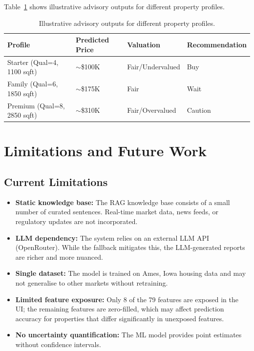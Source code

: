 \documentclass[11pt,a4paper]{article}
\begin{document}
Table~\ref{tab:advisory-examples} shows illustrative advisory outputs for different property profiles.

\begin{table}[H]
    \centering
    \caption{Illustrative advisory outputs for different property profiles.}
    \label{tab:advisory-examples}
    \begin{tabular}{llll}
        \toprule
        \textbf{Profile} & \textbf{Predicted Price} & \textbf{Valuation} & \textbf{Recommendation} \\
        \midrule
        Starter (Qual=4, 1100 sqft) & $\sim$\$100K & Fair/Undervalued & Buy \\
        Family (Qual=6, 1850 sqft)  & $\sim$\$175K & Fair & Wait \\
        Premium (Qual=8, 2850 sqft) & $\sim$\$310K & Fair/Overvalued & Caution \\
        \bottomrule
    \end{tabular}
\end{table}

\section{Limitations and Future Work}

\subsection{Current Limitations}

\begin{itemize}[leftmargin=*]
    \item \textbf{Static knowledge base:} The RAG knowledge base consists of a small number of curated sentences. Real-time market data, news feeds, or regulatory updates are not incorporated.
    \item \textbf{LLM dependency:} The system relies on an external LLM API (OpenRouter). While the fallback mitigates this, the LLM-generated reports are richer and more nuanced.
    \item \textbf{Single dataset:} The model is trained on Ames, Iowa housing data and may not generalise to other markets without retraining.
    \item \textbf{Limited feature exposure:} Only 8 of the 79 features are exposed in the UI; the remaining features are zero-filled, which may affect prediction accuracy for properties that differ significantly in unexposed features.
    \item \textbf{No uncertainty quantification:} The ML model provides point estimates without confidence intervals.
\end{itemize}
\end{document}
